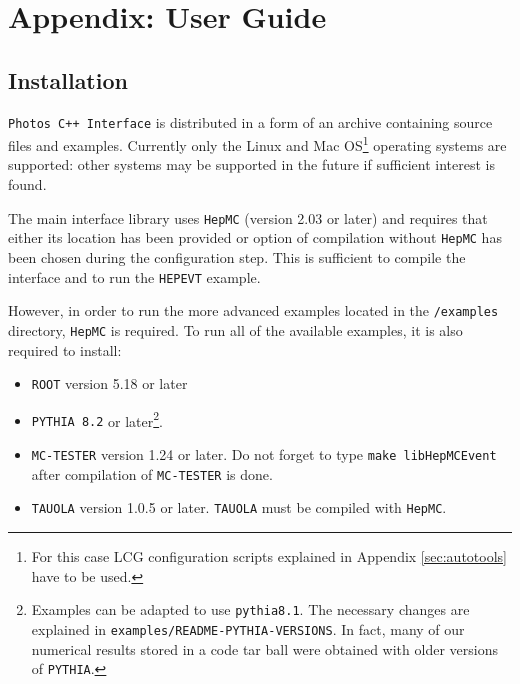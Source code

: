 \documentclass[]{Photos_interface_design}
\begin{document}
\section{Appendix: User Guide}
\label{sec:User Guide}

\subsection{Installation}
\label{sec:Installation}
 
{\tt Photos C++ Interface} is distributed in a form of an archive containing source files and examples.
Currently only the Linux and Mac OS\footnote{For this case LCG configuration 
scripts explained in Appendix \ref{sec:autotools} have to be used.} operating systems are supported: other systems may be
supported in the future if sufficient interest is found.

The main interface library uses {\tt HepMC} \cite{Dobbs:2001ck} (version 2.03 or later) and requires that either
its location has been provided or option of compilation without {\tt HepMC} has been chosen during the configuration step.
This is sufficient to compile the interface and to run the {\tt HEPEVT} example.

However, in order to run the more advanced examples located in the {\tt /examples} directory, {\tt HepMC} is required.
To run all of the available examples, it is also required to install:

\begin{itemize}
  \item {\tt ROOT} \cite{root-install-www} version 5.18 or later
  \item {\tt PYTHIA 8.2} \cite{Sjostrand:2007gs} or later\footnote{
        Examples can be adapted to use {\tt pythia8.1}. The necessary changes are explained in {\tt examples/README-PYTHIA-VERSIONS}. In fact, many of our numerical results stored in a code tar ball were obtained with older versions of 
{\tt PYTHIA}.}.
  \item {\tt MC-TESTER} \cite{Golonka:2002rz,Davidson:2008ma} version 1.24 or later.
        Do not forget to type {\tt make libHepMCEvent} after compilation of {\tt MC-TESTER} is done.
  \item {\tt TAUOLA} \cite{Davidson:2010rw} version 1.0.5 or later. {\tt TAUOLA} must be compiled with {\tt HepMC}.
\end{itemize}
\end{document}
